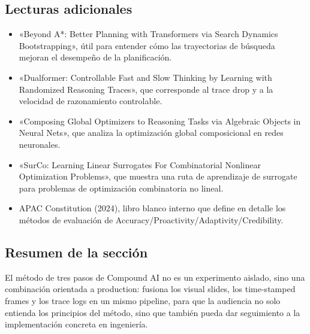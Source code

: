 \subsection{Lecturas adicionales}
\begin{itemize}
    \item «Beyond A*: Better Planning with Transformers via Search Dynamics Bootstrapping», útil para entender cómo las trayectorias de búsqueda mejoran el desempeño de la planificación.
    \item «Dualformer: Controllable Fast and Slow Thinking by Learning with Randomized Reasoning Traces», que corresponde al trace drop y a la velocidad de razonamiento controlable.
    \item «Composing Global Optimizers to Reasoning Tasks via Algebraic Objects in Neural Nets», que analiza la optimización global composicional en redes neuronales.
    \item «SurCo: Learning Linear Surrogates For Combinatorial Nonlinear Optimization Problems», que muestra una ruta de aprendizaje de surrogate para problemas de optimización combinatoria no lineal.
    \item APAC Constitution (2024), libro blanco interno que define en detalle los métodos de evaluación de Accuracy/Proactivity/Adaptivity/Credibility.
\end{itemize}

\subsection{Resumen de la sección}
El método de tres pasos de Compound AI no es un experimento aislado, sino una combinación orientada a production: fusiona los visual slides, los time-stamped frames y los trace logs en un mismo pipeline, para que la audiencia no solo entienda los principios del método, sino que también pueda dar seguimiento a la implementación concreta en ingeniería.


